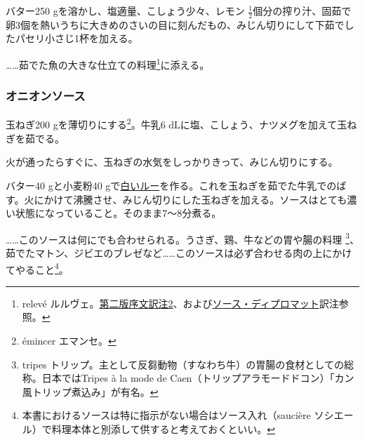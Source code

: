 \begin{recette}
バター250 gを溶かし、塩適量、こしょう少々、レモン
\(\frac{1}{2}\)個分の搾り汁、固茹で卵3個を熱いうちに大きめのさいの目に刻んだもの、みじん切りにして下茹でしたパセリ小さじ1杯を加える。

\ldots{}\ldots{}茹でた魚の大きな仕立ての料理\footnote{relevé
  ルルヴェ。\protect\hyperlink{releve}{第二版序文訳注2}、および\protect\hyperlink{sauce-diplomate}{ソース・ディプロマット}訳注参照。}に添える。

\atoaki{}

\hypertarget{onions-sauce}{%
\subsubsection{オニオンソース}\label{onions-sauce}}



玉ねぎ200 gを薄切りにする\footnote{émincer エマンセ。}。牛乳6
dLに塩、こしょう、ナツメグを加えて玉ねぎを茹でる。

火が通ったらすぐに、玉ねぎの水気をしっかりきって、みじん切りにする。

バター40 gと小麦粉40
gで\protect\hyperlink{roux-blanc}{白いルー}を作る。これを玉ねぎを茹でた牛乳でのばす。火にかけて沸騰させ、みじん切りにした玉ねぎを加える。ソースはとても濃い状態になっていること。そのまま7〜8分煮る。

\ldots{}\ldots{}このソースは何にでも合わせられる。うさぎ、鶏、牛などの胃や腸の料理
\footnote{tripes
  トリップ。主として反芻動物（すなわち牛）の胃腸の食材としての総称。日本ではTripes
  à la mode de
  Caen（トリップアラモードドコン）「カン風トリップ煮込み」が有名。}、茹でたマトン、ジビエのブレゼなど\ldots{}\ldots{}このソースは必ず合わせる肉の上にかけてやること\footnote{本書におけるソースは特に指示がない場合はソース入れ（saucière
  ソシエール）で料理本体と別添して供すると考えておくといい。}。

\atoaki{}


\end{recette}
